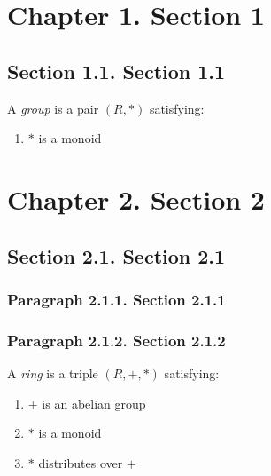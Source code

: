 \hypertarget{sec:1}{%
\section{Chapter 1. Section 1}\label{sec:1}}

\hypertarget{sec:11}{%
\subsection{Section 1.1. Section 1.1}\label{sec:11}}

\leavevmode\hypertarget{dfn:group}{}%
A \emph{group} is a pair \((R,*)\) satisfying:

\begin{enumerate}
\tightlist
\item
  \protect\hypertarget{cl:grpmul}{}{\(*\) is a monoid}
\end{enumerate}

\hypertarget{sec:2}{%
\section{Chapter 2. Section 2}\label{sec:2}}

\hypertarget{sec:21}{%
\subsection{Section 2.1. Section 2.1}\label{sec:21}}

\hypertarget{sec:211}{%
\subsubsection{Paragraph 2.1.1. Section 2.1.1}\label{sec:211}}

\hypertarget{sec:212}{%
\subsubsection{Paragraph 2.1.2. Section 2.1.2}\label{sec:212}}

\leavevmode\hypertarget{dfn:ring}{}%
A \emph{ring} is a triple \((R,+,*)\) satisfying:

\begin{enumerate}
\tightlist
\item
  \protect\hypertarget{cl:addgp}{}{\(+\) is an abelian group}
\item
  \protect\hypertarget{cl:multmon}{}{\(*\) is a monoid}
\item
  \protect\hypertarget{cl:distrib}{}{\(*\) distributes over \(+\)}
\end{enumerate}

